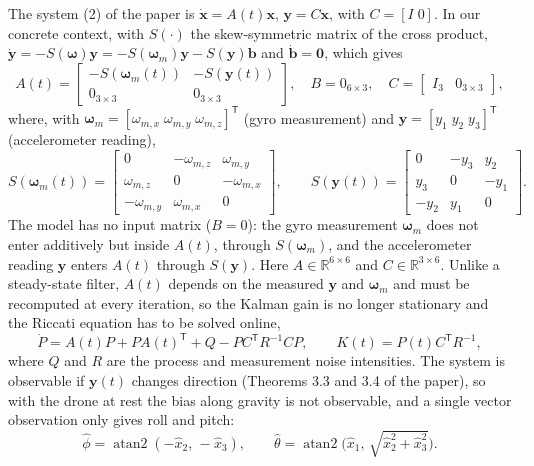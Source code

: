\documentclass[11pt]{article}
\newcommand{\vect}[1]{\mathbf{#1}}
\begin{document}
The system (2) of the paper is $\dot{\vect{x}}=A(t)\vect{x}$, $\vect{y}=C\vect{x}$, with $C=[I\;0]$.
In our concrete context, with $S(\cdot)$ the skew-symmetric matrix of the cross product, $\dot{\vect{y}}=-S(\vect{\omega})\vect{y}=-S(\vect{\omega}_m)\vect{y}-S(\vect{y})\vect{b}$ and $\dot{\vect{b}}=\vect{0}$, which gives
\begin{equation}
A(t)=\begin{bmatrix} -S(\vect{\omega}_m(t)) & -S(\vect{y}(t)) \\ 0_{3\times3} & 0_{3\times3} \end{bmatrix},
\quad
B=0_{6\times3},
\quad
C=\begin{bmatrix} I_3 & 0_{3\times3} \end{bmatrix},
\label{eq:ABC}
\end{equation}
where, with $\vect{\omega}_m=[\omega_{m,x}\;\omega_{m,y}\;\omega_{m,z}]^{\mathsf T}$ (gyro measurement) and $\vect{y}=[y_1\;y_2\;y_3]^{\mathsf T}$ (accelerometer reading),
\begin{equation}
S(\vect{\omega}_m(t))=\begin{bmatrix} 0 & -\omega_{m,z} & \omega_{m,y} \\ \omega_{m,z} & 0 & -\omega_{m,x} \\ -\omega_{m,y} & \omega_{m,x} & 0 \end{bmatrix},
\qquad
S(\vect{y}(t))=\begin{bmatrix} 0 & -y_3 & y_2 \\ y_3 & 0 & -y_1 \\ -y_2 & y_1 & 0 \end{bmatrix}.
\end{equation}
The model has no input matrix ($B=0$): the gyro measurement $\vect{\omega}_m$ does not enter additively but inside $A(t)$, through $S(\vect{\omega}_m)$, and the accelerometer reading $\vect{y}$ enters $A(t)$ through $S(\vect{y})$.
Here $A\in\mathbb{R}^{6\times6}$ and $C\in\mathbb{R}^{3\times6}$.
Unlike a steady-state filter, $A(t)$ depends on the measured $\vect{y}$ and $\vect{\omega}_m$ and must be recomputed at every iteration, so the Kalman gain is no longer stationary and the Riccati equation has to be solved online,
\begin{equation}
\dot P = A(t)P + PA(t)^{\mathsf T} + Q - PC^{\mathsf T}R^{-1}CP, \qquad K(t) = P(t)C^{\mathsf T}R^{-1},
\label{eq:riccati}
\end{equation}
where $Q$ and $R$ are the process and measurement noise intensities.
The system is observable if $\vect{y}(t)$ changes direction (Theorems 3.3 and 3.4 of the paper), so with the drone at rest the bias along gravity is not observable, and a single vector observation only gives roll and pitch:
\begin{equation}
\hat\phi = \operatorname{atan2}(-\hat x_2,\,-\hat x_3), \qquad
\hat\theta = \operatorname{atan2}\!\big(\hat x_1,\,\sqrt{\hat x_2^{2}+\hat x_3^{2}}\big).
\label{eq:angles}
\end{equation}
\end{document}
